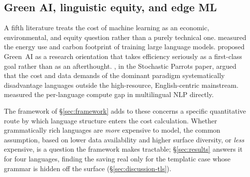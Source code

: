 \subsection{Green AI, linguistic equity, and edge ML}
\label{sec:related-economics}

A fifth literature treats the cost of machine learning as an economic, environmental, and equity question rather than a purely technical one. \citet{strubell2019} measured the energy use and carbon footprint of training large language models. \citet{schwartz2020} proposed Green~AI as a research orientation that takes efficiency seriously as a first-class goal rather than as an afterthought. \citet{bender2021}, in the Stochastic Parrots paper, argued that the cost and data demands of the dominant paradigm systematically disadvantage languages outside the high-resource, English-centric mainstream. \citet{ahia2023} measured the per-language compute gap in multilingual NLP directly.

The framework of \S\ref{sec:framework} adds to these concerns a specific quantitative route by which language structure enters the cost calculation. Whether grammatically rich languages are \emph{more} expensive to model, the common assumption, based on lower data availability and higher surface diversity, or \emph{less} expensive, is a question the framework makes tractable; \S\ref{sec:results} answers it for four languages, finding the saving real only for the templatic case whose grammar is hidden off the surface (\S\ref{sec:discussion-tls}).
